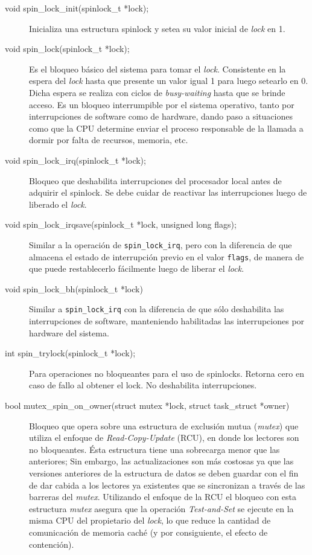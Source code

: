 \begin{description}
\item[void spin\_lock\_init(spinlock\_t *lock);] Inicializa una estructura spinlock y setea su valor inicial de \emph{lock} en 1.
\item[void spin\_lock(spinlock\_t *lock);] Es el bloqueo básico del sistema para tomar el \emph{lock}. Consistente en la espera del \emph{lock} hasta que presente un valor igual 1 para luego setearlo en 0. Dicha espera se realiza con ciclos de \emph{busy-waiting} hasta que se brinde acceso. Es un bloqueo interrumpible por el sistema operativo, tanto por interrupciones de software como de hardware, dando paso a situaciones como que la CPU determine enviar el proceso responsable de la llamada a dormir por falta de recursos, memoria, etc.
\item[void spin\_lock\_irq(spinlock\_t *lock);] Bloqueo que deshabilita interrupciones del procesador local antes de adquirir el spinlock. Se debe cuidar de reactivar las interrupciones luego de liberado el \emph{lock}.
\item[void spin\_lock\_irqsave(spinlock\_t *lock, unsigned long flags);] Similar a la operación de \verb=spin_lock_irq=, pero con la diferencia de que almacena el estado de interrupción previo en el valor \verb=flags=, de manera de que puede restablecerlo fácilmente luego de liberar el \emph{lock}.
\item[void spin\_lock\_bh(spinlock\_t *lock)] Similar a \verb=spin_lock_irq= con la diferencia de que sólo deshabilita las interrupciones de software, manteniendo habilitadas las interrupciones por hardware del sistema.
\item[int spin\_trylock(spinlock\_t *lock);] Para operaciones no bloqueantes para el uso de spinlocks. Retorna cero en caso de fallo al obtener el lock. No deshabilita interrupciones.
\item[bool mutex\_spin\_on\_owner(struct mutex *lock, struct task\_struct *owner)] Bloqueo que opera sobre una estructura de exclusión mutua (\emph{mutex}) que utiliza el enfoque de \emph{Read-Copy-Update} (RCU), en donde los lectores son no bloqueantes. Ésta estructura tiene una sobrecarga menor que las anteriores; Sin embargo, las actualizaciones son más costosas ya que las versiones anteriores de la estructura de datos se deben guardar con el fin de dar cabida a los lectores ya existentes que se sincronizan a través de las barreras del \emph{mutex}. Utilizando el enfoque de la RCU el bloqueo con esta estructura \emph{mutex} asegura que la operación \emph{Test-and-Set} se ejecute en la misma CPU del propietario del \emph{lock}, lo que reduce la cantidad de comunicación de memoria caché (y por consiguiente, el efecto de contención).
\end{description}

